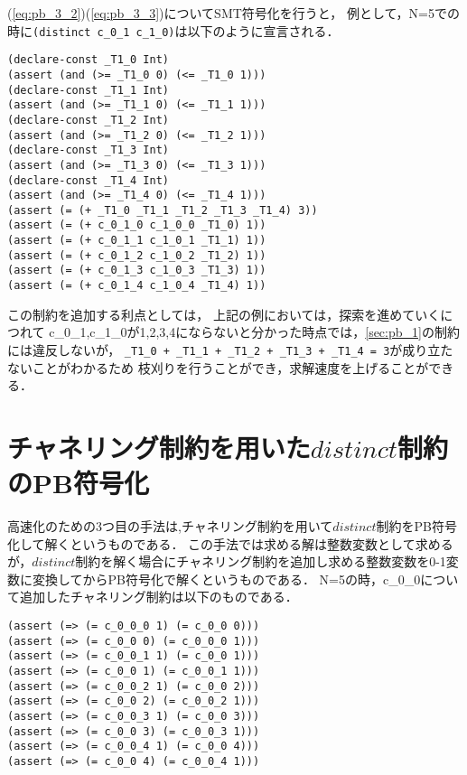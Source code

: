 (\ref{eq:pb_3_2})(\ref{eq:pb_3_3})についてSMT符号化を行うと，
例として，N=5での時に\verb|(distinct c_0_1 c_1_0)|は以下のように宣言される．

\begin{verbatim}
(declare-const _T1_0 Int)
(assert (and (>= _T1_0 0) (<= _T1_0 1)))
(declare-const _T1_1 Int)
(assert (and (>= _T1_1 0) (<= _T1_1 1)))
(declare-const _T1_2 Int)
(assert (and (>= _T1_2 0) (<= _T1_2 1)))
(declare-const _T1_3 Int)
(assert (and (>= _T1_3 0) (<= _T1_3 1)))
(declare-const _T1_4 Int)
(assert (and (>= _T1_4 0) (<= _T1_4 1)))
(assert (= (+ _T1_0 _T1_1 _T1_2 _T1_3 _T1_4) 3))
(assert (= (+ c_0_1_0 c_1_0_0 _T1_0) 1))
(assert (= (+ c_0_1_1 c_1_0_1 _T1_1) 1))
(assert (= (+ c_0_1_2 c_1_0_2 _T1_2) 1))
(assert (= (+ c_0_1_3 c_1_0_3 _T1_3) 1))
(assert (= (+ c_0_1_4 c_1_0_4 _T1_4) 1))
\end{verbatim}

この制約を追加する利点としては，
上記の例においては，探索を進めていくにつれて
c\_0\_1,c\_1\_0が1,2,3,4にならないと分かった時点では，\ref{sec:pb_1}の制約には違反しないが，
\verb|_T1_0 + _T1_1 + _T1_2 + _T1_3 + _T1_4 = 3|が成り立たないことがわかるため
枝刈りを行うことができ，求解速度を上げることができる．



%
%
\section{チャネリング制約を用いた$distinct$制約のPB符号化}
高速化のための3つ目の手法は,チャネリング制約を用いて$distinct$制約をPB符号化して解くというものである．
この手法では求める解は整数変数として求めるが，$distinct$制約を解く場合にチャネリング制約を追加し求める整数変数を0-1変数に変換してからPB符号化で解くというものである．
N=5の時，c\_0\_0について追加したチャネリング制約は以下のものである．
\begin{verbatim}
(assert (=> (= c_0_0_0 1) (= c_0_0 0)))
(assert (=> (= c_0_0 0) (= c_0_0_0 1)))
(assert (=> (= c_0_0_1 1) (= c_0_0 1)))
(assert (=> (= c_0_0 1) (= c_0_0_1 1)))
(assert (=> (= c_0_0_2 1) (= c_0_0 2)))
(assert (=> (= c_0_0 2) (= c_0_0_2 1)))
(assert (=> (= c_0_0_3 1) (= c_0_0 3)))
(assert (=> (= c_0_0 3) (= c_0_0_3 1)))
(assert (=> (= c_0_0_4 1) (= c_0_0 4)))
(assert (=> (= c_0_0 4) (= c_0_0_4 1)))
\end{verbatim}




